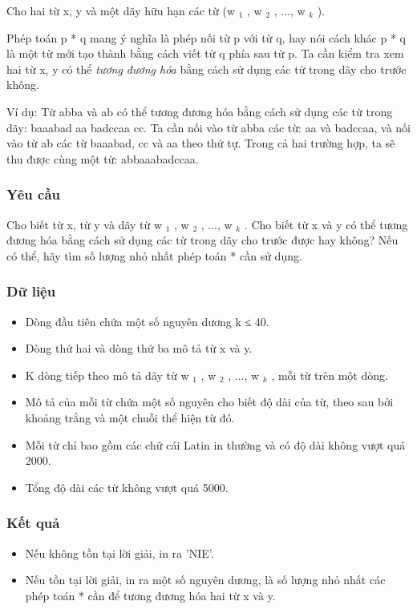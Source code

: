 



   Cho hai từ x, y và một dãy hữu hạn các từ (w   $_    1   $   , w   $_    2   $   , ..., w   $_    k   $   ).  



   Phép toán p * q mang ý nghĩa là phép nối từ p với từ q, hay nói cách khác p * q là một từ mới tạo thành bằng cách viết từ q phía sau từ p.   Ta cần kiểm tra xem hai từ x, y có thể   \textit{    tương đương hóa   }   bằng cách sử dụng các từ trong dãy cho trước không.  

   Ví dụ: Từ abba và ab có thể tương đương hóa bằng cách sử dụng các từ trong dãy: baaabad aa badccaa cc. Ta cần nối vào từ abba các   từ: aa và badccaa, và nối vào từ ab các từ baaabad, cc và aa theo thứ tự. Trong cả hai trường hợp, ta sẽ thu được cùng một từ:   abbaaabadccaa.  

\subsubsection{   Yêu cầu  }

   Cho biết từ x, từ y và dãy từ w   $_    1   $   , w   $_    2   $   , ..., w   $_    k   $   . Cho biết từ x và y có thể tương đương hóa bằng cách   sử dụng các từ trong dãy cho trước được hay không? Nếu có thể, hãy tìm số lượng nhỏ nhất phép toán * cần sử dụng.  

\subsubsection{   Dữ liệu  }
\begin{itemize}
	\item     Dòng đầu tiên chứa một số nguyên dương k ≤ 40.   
	\item     Dòng thứ hai và dòng thứ ba mô tả từ x và y.   
	\item     K dòng tiếp theo mô tả dãy từ w    $_     1    $    , w    $_     2    $    , ..., w    $_     k    $    , mỗi từ trên một dòng.   
	\item     Mô tả của mỗi từ chứa một số nguyên cho biết độ dài của từ, theo sau bởi khoảng trắng và một chuỗi thể hiện từ đó.   
	\item     Mỗi từ chỉ bao gồm các chữ cái Latin in thường và có độ dài không vượt quá 2000.   
	\item     Tổng độ dài các từ không vượt quá 5000.   
\end{itemize}

\subsubsection{   Kết quả  }
\begin{itemize}
	\item     Nếu không tồn tại lời giải, in ra 'NIE'.   
	\item     Nếu tồn tại lời giải, in ra một số nguyên dương, là số lượng nhỏ nhất các phép toán * cần để tương đương hóa hai từ x và y.   
\end{itemize}

